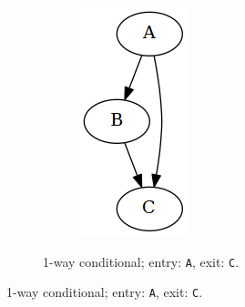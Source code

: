 \begin{figure}[htbp]
\begin{subfigure}[ht]{0.23\textwidth}
\begin{subfigure}[ht]{0.42\textwidth}
			\includegraphics[width=\textwidth]{inc/primitives/if.png}
		\end{subfigure}
		\caption{1-way conditional; entry: \texttt{A}, exit: \texttt{C}.}

\end{subfigure}
\end{figure}
